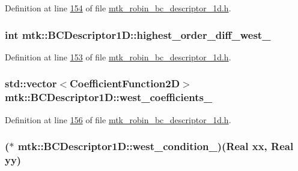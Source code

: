Definition at line \hyperlink{mtk__robin__bc__descriptor__1d_8h_source_l00154}{154} of file \hyperlink{mtk__robin__bc__descriptor__1d_8h_source}{mtk\+\_\+robin\+\_\+bc\+\_\+descriptor\+\_\+1d.\+h}.

\hypertarget{classmtk_1_1BCDescriptor1D_a18ac9c75ffd5af33366c0c43c8191cf2}{
\subsubsection[{highest\+\_\+order\+\_\+diff\+\_\+west\+\_\+}]{\setlength{\rightskip}{0pt plus 5cm}int mtk\+::\+B\+C\+Descriptor1\+D\+::highest\+\_\+order\+\_\+diff\+\_\+west\+\_\+}}\label{classmtk_1_1BCDescriptor1D_a18ac9c75ffd5af33366c0c43c8191cf2}


Definition at line \hyperlink{mtk__robin__bc__descriptor__1d_8h_source_l00153}{153} of file \hyperlink{mtk__robin__bc__descriptor__1d_8h_source}{mtk\+\_\+robin\+\_\+bc\+\_\+descriptor\+\_\+1d.\+h}.

\hypertarget{classmtk_1_1BCDescriptor1D_a0d4c145da23dd5eaacebd17ee421c0a6}{
\subsubsection[{west\+\_\+coefficients\+\_\+}]{\setlength{\rightskip}{0pt plus 5cm}std\+::vector$<${\bf Coefficient\+Function2\+D}$>$ mtk\+::\+B\+C\+Descriptor1\+D\+::west\+\_\+coefficients\+\_\+}}\label{classmtk_1_1BCDescriptor1D_a0d4c145da23dd5eaacebd17ee421c0a6}


Definition at line \hyperlink{mtk__robin__bc__descriptor__1d_8h_source_l00156}{156} of file \hyperlink{mtk__robin__bc__descriptor__1d_8h_source}{mtk\+\_\+robin\+\_\+bc\+\_\+descriptor\+\_\+1d.\+h}.

\hypertarget{classmtk_1_1BCDescriptor1D_a2e2c621083756cc2c47b981302485836}{
\subsubsection[{west\+\_\+condition\+\_\+}]{($\ast$ mtk\+::\+B\+C\+Descriptor1\+D\+::west\+\_\+condition\+\_\+)({\bf Real} xx, {\bf Real} yy)}}\label{classmtk_1_1BCDescriptor1D_a2e2c621083756cc2c47b981302485836}


